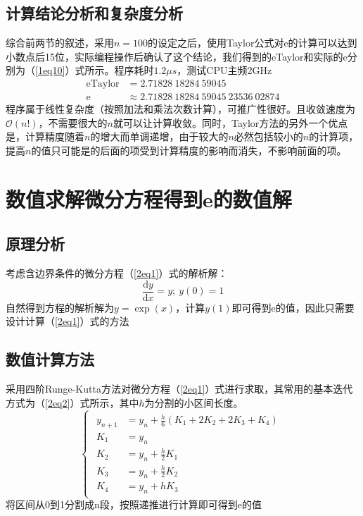 \documentclass[onecolumn,compsoc]{IEEEtran}
\renewcommand{\d}{\mathrm{d}}
\renewcommand{\|}{\Bigg |}
\newcommand{\e}{\mathrm{e}}
\begin{document}
\subsection{计算结论分析和复杂度分析}
综合前两节的叙述，采用$n = 100$的设定之后，使用Taylor公式对e的计算可以达到小数点后15位，实际编程操作后确认了这个结论，我们得到的eTaylor和实际的e分别为（\ref{1eq10}）式所示。程序耗时$1.2\mu s$，测试CPU主频2GHz
\begin{equation}\label{1eq10}\begin{aligned}
\mathrm{eTaylor} &= 2.71828\ 18284\ 59045 \\ 
\e &\approx 2.71828\ 18284\ 59045\ 23536\ 02874 
\end{aligned}\end{equation}
程序属于线性复杂度（按照加法和乘法次数计算），可推广性很好。且收敛速度为$\mathcal{O}(n!)$，不需要很大的$n$就可以让计算收敛。同时，Taylor方法的另外一个优点是，计算精度随着$n$的增大而单调递增，由于较大的$n$必然包括较小的$n$的计算项，提高$n$的值只可能是的后面的项受到计算精度的影响而消失，不影响前面的项。
\section{数值求解微分方程得到e的数值解}
\subsection{原理分析}
考虑含边界条件的微分方程（\ref{2eq1}）式的解析解：
\begin{equation}\label{2eq1}
\frac{\d y}{\d x} = y;\  y(0) = 1
\end{equation}
自然得到方程的解析解为$y = \exp(x)$，计算$y(1)$即可得到e的值，因此只需要设计计算（\ref{2eq1}）式的方法
\subsection{数值计算方法}
采用四阶Runge-Kutta方法对微分方程（\ref{2eq1}）式进行求取，其常用的基本迭代方式为（\ref{2eq2}）式所示，其中$h$为分割的小区间长度。
\begin{equation}\label{2eq2}\begin{cases}\begin{aligned}
y_{n+1} &= y_n + \frac{h}{6}(K_1+2K_2+2K_3+K_4)\\
K_1 &= y_n\\
K_2 &= y_n + \frac{h}{2}K_1 \\
K_3 &= y_n + \frac{h}{2}K_2 \\
K_4 &= y_n + hK_3
\end{aligned}\end{cases}\end{equation}
将区间从0到1分割成n段，按照递推进行计算即可得到e的值
\end{document}
